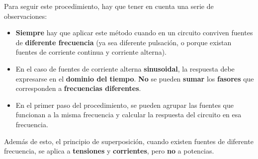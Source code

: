 \documentclass[11pt]{book} %
\begin{document}
	Para seguir este procedimiento, hay que tener en cuenta una serie de observaciones: 
\begin{itemize}
\item \textbf{Siempre} hay que aplicar este método cuando en un circuito conviven fuentes de \textbf{diferente frecuencia} (ya sea diferente pulsación, o porque existan fuentes de corriente continua y corriente alterna).
\item En el caso de fuentes de corriente alterna \textbf{sinusoidal}, la respuesta debe expresarse en el \textbf{dominio del tiempo}. \textbf{No} se pueden \textbf{sumar} los \textbf{fasores} que corresponden a \textbf{frecuencias diferentes}.
\item En el primer paso del procedimiento, se pueden agrupar las fuentes que funcionan a la misma frecuencia y calcular la respuesta del circuito en esa frecuencia.
\end{itemize}

Además de esto, el principio de superposición, cuando existen fuentes de diferente frecuencia, se aplica a \textbf{tensiones} y \textbf{corrientes}, pero \textbf{no} a potencias. 
	
\end{document}
